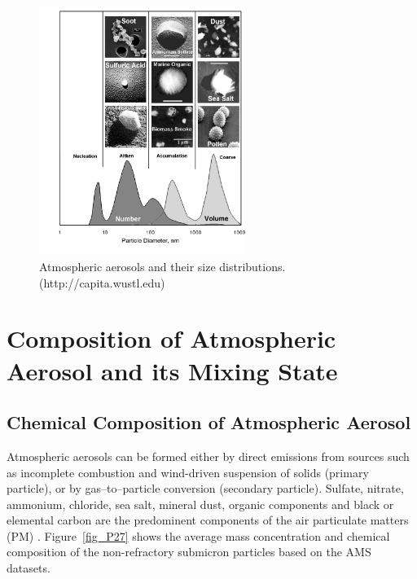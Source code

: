 \documentclass[12pt, fullpage]{uiucthesis2009}
\begin{document}
		\begin{figure}[h] 
			\begin{center}
				\includegraphics[width = 0.6\textwidth]{Figure26}
				\caption[Atmospheric aerosols and their size distributions]{\label{fig_P26} Atmospheric aerosols and their size distributions. \\ (http://capita.wustl.edu)}
			\end{center}
		\end{figure}

	\section{Composition of Atmospheric Aerosol and its Mixing State}
	\subsection{Chemical Composition of Atmospheric Aerosol}
	Atmospheric aerosols can be formed either by direct emissions from sources such as incomplete combustion and wind-driven suspension of solids (primary particle), or by gas--to--particle conversion (secondary particle). Sulfate, nitrate, ammonium, chloride, sea salt, mineral dust, organic components and black or elemental carbon are the predominent components of the air particulate matters (PM) \citep{poschl2005}. Figure~\ref{fig_P27} shows the average mass concentration and chemical composition of the non-refractory submicron particles based on the AMS datasets.
	
\end{document}
